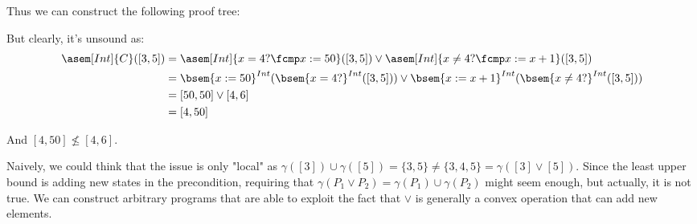\begin{example}
  Thus we can construct the following proof tree:
  \begin{prooftree}
  \end{prooftree}

  But clearly, it's unsound as:
  \begin{align*}
    \asem[Int]{C}([3, 5]) &= \asem[Int]{x = 4? \fcmp x := 50}([3, 5])
      \lor \asem[Int]{x \neq 4? \fcmp x := x + 1}([3, 5]) \\
                          &= \bsem{x := 50}^{Int}(\bsem{x = 4?}^{Int}([3, 5]))
      \lor \bsem{x := x + 1}^{Int}(\bsem{x \neq 4?}^{Int}([3, 5])) \\
                          &= [50, 50] \lor [4, 6] \\
                          &= [4, 50]
  \end{align*}

  And $[4, 50] \not \leq [4, 6]$.
\end{example}

Naively, we could think that the issue is only "local" as $\gamma([3]) \cup 
\gamma([5]) = \{3, 5\} \neq \{3, 4, 5\} = \gamma([3] \lor [5])$. Since the least
upper bound is adding new states in the precondition, requiring that
$\gamma(P_1 \lor P_2) = \gamma(P_1) \cup \gamma(P_2)$ might seem enough, but 
actually, it is not true. We can construct arbitrary programs that are able to 
exploit the fact that $\lor$ is generally a convex operation that can add new 
elements.

\begin{definition} $\;$\\
  \begin{prooftree}
  \end{prooftree}
\end{definition}

